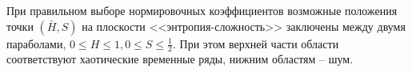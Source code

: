 При правильном выборе нормировочных коэффициентов возможные положения точки $(\bar{H}, S)$ на плоскости <<энтропия-сложность>> заключены между двумя параболами, $0 \leq H \leq 1, 0 \leq S \leq \frac{1}{2}$. При этом верхней части области соответствуют хаотические временные ряды, нижним областям -- шум.
